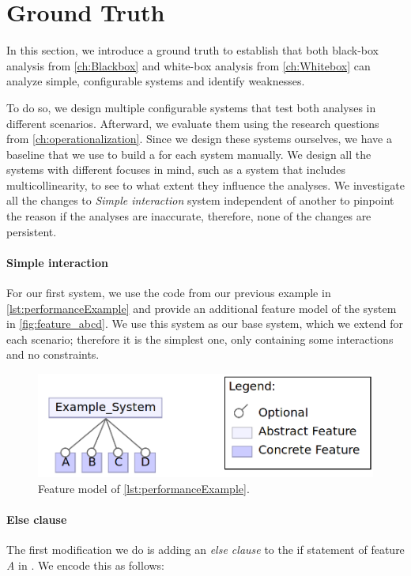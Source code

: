 \section{Ground Truth}\label{sec:ground-truth}
In this section, we introduce a ground truth to establish that both black-box analysis from \autoref{ch:Blackbox} 
and white-box analysis from \autoref{ch:Whitebox} can analyze simple, configurable systems and identify weaknesses. 

To do so, we design multiple configurable systems that test both analyses in different scenarios. 
Afterward, we evaluate them using the research questions from \autoref{ch:operationalization}. 
Since we design these systems ourselves, we have a baseline that we use to build a {\perfInfluenceModel} for each system manually. 
We design all the systems with different focuses in mind, such as a system that includes multicollinearity, 
to see to what extent they influence the analyses. 
We investigate all the changes to \emph{Simple interaction} system independent of another to pinpoint the reason if the analyses
are inaccurate, therefore, none of the changes are persistent.


\paragraph{Simple interaction}\label{ground-truth:Simple}
For our first system, we use the code from our previous example in \autoref{lst:performanceExample} and provide an additional feature model 
of the system in \autoref{fig:feature_abcd}. 
We use this system as our base system, which we extend for each scenario; therefore it is the simplest one, 
only containing some interactions and no constraints.

\begin{figure}[h]
    \centering
    \includegraphics[scale=0.25]{gfx/Feature_ABCD.png}
    \caption{Feature model of \autoref{lst:performanceExample}.}
    \label{fig:feature_abcd}
\end{figure}


\paragraph{Else clause}
The first modification we do is adding an \emph{else clause} to the if statement of feature \emph{A} in . 
We encode this as follows:

